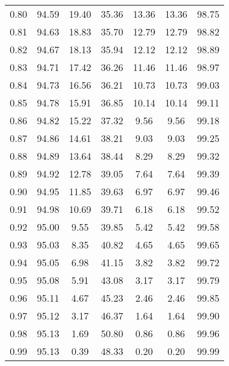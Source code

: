 \begin{tabular}{|c|c|c|c|c|c|c|}
      0.80 &     94.59 &     19.40 &      35.36 &   13.36 &      13.36 &         98.75 \\
      0.81 &     94.63 &     18.83 &      35.70 &   12.79 &      12.79 &         98.82 \\
      0.82 &     94.67 &     18.13 &      35.94 &   12.12 &      12.12 &         98.89 \\
      0.83 &     94.71 &     17.42 &      36.26 &   11.46 &      11.46 &         98.97 \\
      0.84 &     94.73 &     16.56 &      36.21 &   10.73 &      10.73 &         99.03 \\
      0.85 &     94.78 &     15.91 &      36.85 &   10.14 &      10.14 &         99.11 \\
      0.86 &     94.82 &     15.22 &      37.32 &    9.56 &       9.56 &         99.18 \\
      0.87 &     94.86 &     14.61 &      38.21 &    9.03 &       9.03 &         99.25 \\
      0.88 &     94.89 &     13.64 &      38.44 &    8.29 &       8.29 &         99.32 \\
      0.89 &     94.92 &     12.78 &      39.05 &    7.64 &       7.64 &         99.39 \\
      0.90 &     94.95 &     11.85 &      39.63 &    6.97 &       6.97 &         99.46 \\
      0.91 &     94.98 &     10.69 &      39.71 &    6.18 &       6.18 &         99.52 \\
      0.92 &     95.00 &      9.55 &      39.85 &    5.42 &       5.42 &         99.58 \\
      0.93 &     95.03 &      8.35 &      40.82 &    4.65 &       4.65 &         99.65 \\
      0.94 &     95.05 &      6.98 &      41.15 &    3.82 &       3.82 &         99.72 \\
      0.95 &     95.08 &      5.91 &      43.08 &    3.17 &       3.17 &         99.79 \\
      0.96 &     95.11 &      4.67 &      45.23 &    2.46 &       2.46 &         99.85 \\
      0.97 &     95.12 &      3.17 &      46.37 &    1.64 &       1.64 &         99.90 \\
      0.98 &     95.13 &      1.69 &      50.80 &    0.86 &       0.86 &         99.96 \\
      0.99 &     95.13 &      0.39 &      48.33 &    0.20 &       0.20 &         99.99 \\
\bottomrule
\end{tabular}
